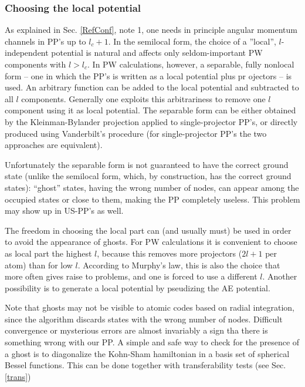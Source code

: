 \documentclass[12pt,a4paper]{article}
\begin{document}
\subsubsection{Choosing the local potential}

As explained in Sec. \ref{RefConf}, note 1, one needs in principle
angular momentum channels in PP's up to $l_c+1$. In the semilocal
form, the choice of a ''local'', $l$-independent potential is natural
and affects only seldom-important PW components with $l> l_c$.
In PW calculations, however, a separable, fully nonlocal form -- 
one in which the PP's is written as a local potential plus pr
ojectors -- is used.
An arbitrary function can be added to the local potential and 
subtracted to all $l$ components. Generally one exploits this 
arbitrariness to remove one $l$ component using it as local potential.
The separable form can be either obtained by the Kleinman-Bylander
projection \cite{KB} applied to single-projector PP's, or directly 
produced using Vanderbilt's procedure \cite{van} (for single-projector
PP's the two approaches are equivalent).

Unfortunately the separable form is not guaranteed to have the
correct ground state (unlike the semilocal form, which, by construction,
has the correct ground states): ``ghost'' states, having the wrong number 
of nodes, 
can appear among the occupied states or close to them, making the 
PP completely useless. This problem may show up in US-PP's as well.

The freedom in choosing the local part can (and usually must) be used 
in order to avoid the appearance of ghosts. For PW calculations it is 
convenient to choose as local part the highest $l$, because this removes
more projectors ($2l+1$ per atom) than for low $l$. According to Murphy's 
law, this is also the choice that more often gives raise to problems, 
and one is forced to use a different $l$. Another possibility is to generate 
a local potential by pseudizing the AE potential.

Note that ghosts may not be visible to atomic codes based on radial
integration, since the algorithm discards states with the wrong number 
of nodes. Difficult convergence or mysterious errors are almost invariably
a sign tha there is something wrong with our PP. 
A simple and safe way to check for the presence of a ghost is to diagonalize 
the Kohn-Sham hamiltonian in a basis set of spherical Bessel functions. 
This can be done together with transferability tests
(see Sec.\ref{trans})
\end{document}
